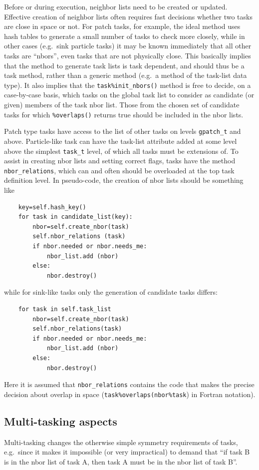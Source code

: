 \documentclass[paper=a4,fontsize=11pt]{scrartcl}
\numberwithin{equation}{section}		%
\numberwithin{figure}{section}			%
\numberwithin{table}{section}				%
\newcommand{\codecolor}{\color{Blue}}
\newcommand{\Code}[1]{{\codecolor\texttt{#1}}}
\def\eg{e.g.\ }
\begin{document}
Before or during execution, neighbor lists need to be created or updated.  Effective creation of neighbor lists often requires fast decisions whether two tasks are close in space or not.  For patch tasks, for example, the ideal method uses hash tables to generate a small number of tasks to check more closely, while in other cases (\eg sink particle tasks) it may be known immediately that all other tasks are ``nbors'', even tasks that are not physically close.  This basically implies that the method to generate task lists is task dependent, and should thus be a task method, rather than a generic method (\eg a method of the task-list data type).  It also implies that the \Code{task\%init\_nbors()} method is free to decide, on a case-by-case basis, which tasks on the global task list to consider as candidate (or given) members of the task nbor list.  Those from the chosen set of candidate tasks for which \Code{\%overlaps()} returns true should be included in the nbor lists.

Patch type tasks have access to the list of other tasks on levels \Code{gpatch\_t} and above.   Particle-like task can have the task-list attribute added at some level above the simplest \Code{task\_t} level, of which all tasks must be extensions of.  To assist in creating nbor lists and setting correct flags, tasks have the method \Code{nbor\_relations}, which can and often should be overloaded at the top task definition level.  In pseudo-code, the creation of nbor lists should be something like
{\codecolor\small\begin{verbatim}
    key=self.hash_key()
    for task in candidate_list(key):
        nbor=self.create_nbor(task)
        self.nbor_relations (task)
        if nbor.needed or nbor.needs_me:
            nbor_list.add (nbor)
        else:
            nbor.destroy()
\end{verbatim}}
while for sink-like tasks only the generation of candidate tasks differs:
{\codecolor\small\begin{verbatim}
    for task in self.task_list
        nbor=self.create_nbor(task)
        self.nbor_relations(task)
        if nbor.needed or nbor.needs_me:
            nbor_list.add (nbor)
        else:
            nbor.destroy()
\end{verbatim}}
Here it is assumed that \Code{nbor\_relations} contains the code that makes the precise decision about overlap in space (\Code{task\%overlaps(nbor\%task}) in Fortran notation).

\subsection{Multi-tasking aspects}
Multi-tasking changes the otherwise simple symmetry requirements of tasks, e.g.\ since it makes it impossible (or very impractical) to demand that ``if task B is in the nbor list of task A, then task A must be in the nbor list of task B''.
\end{document}
